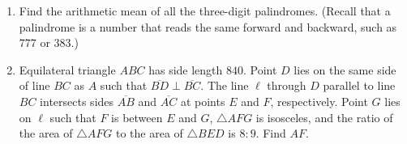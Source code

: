 \documentclass{article}
\begin{document}
\begin{enumerate}[label=\arabic*., itemsep=0.5em]
\item Find the arithmetic mean of all the three-digit palindromes. (Recall that a palindrome is a number that reads the same forward and backward, such as \(777\) or \(383\).)\par \vspace{0.5em}\item Equilateral triangle \(ABC\) has side length \(840\). Point \(D\) lies on the same side of line \(BC\) as \(A\) such that \(\overline{BD} \perp \overline{BC}\). The line \(\ell\) through \(D\) parallel to line \(BC\) intersects sides \(\overline{AB}\) and \(\overline{AC}\) at points \(E\) and \(F\), respectively. Point \(G\) lies on \(\ell\) such that \(F\) is between \(E\) and \(G\), \(\triangle AFG\) is isosceles, and the ratio of the area of \(\triangle AFG\) to the area of \(\triangle BED\) is \(8:9\). Find \(AF\).


\end{enumerate}
\end{document}
